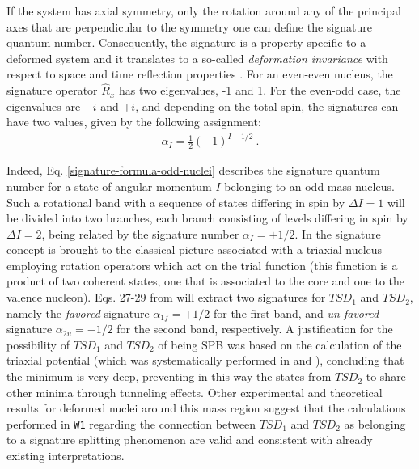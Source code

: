 \documentclass[myclassdoc,debug]{rjparticle}
\begin{document}
If the system has axial symmetry, only the rotation around any of the principal axes that are perpendicular to the symmetry one can define the signature quantum number. Consequently, the signature is a property specific to a deformed system and it translates to a so-called \emph{deformation invariance} with respect to space and time reflection properties \cite{bohr1998nuclear}. For an even-even nucleus, the signature operator $\hat{R}_x$ has two eigenvalues, -1 and 1. For the even-odd case, the eigenvalues are $-i$ and $+i$, and depending on the total spin, the signatures can have two values, given by the following assignment:
\begin{align}
    \alpha_I=\frac{1}{2}\left(-1\right)^{I-1/2}\ .
    \label{signature-formula-odd-nuclei}
\end{align}

Indeed, Eq. \ref{signature-formula-odd-nuclei} describes the signature quantum number for a state of angular momentum $I$ belonging to an odd mass nucleus. Such a rotational band with a sequence of states differing in spin by $\Delta I=1$ will be divided into two branches, each branch consisting of levels differing in spin by $\Delta I=2$, being related by the signature number $\alpha_I=\pm 1/2$. In \cite{raduta2020approach} the signature concept is brought to the classical picture associated with a triaxial nucleus employing rotation operators which act on the trial function (this function is a product of two coherent states, one that is associated to the core and one to the valence nucleon). Eqs. 27-29 from \cite{raduta2020approach} will extract two signatures for $TSD_1$ and $TSD_2$, namely the \emph{favored} signature $\alpha_{1f}=+1/2$ for the first band, and \emph{un-favored} signature $\alpha_{2u}=-1/2$ for the second band, respectively. A justification for the possibility of $TSD_1$ and $TSD_2$ of being SPB was based on the calculation of the triaxial potential (which was systematically performed in \cite{raduta2017semiclassical} and \cite{raduta2018wobbling}), concluding that the minimum is very deep, preventing in this way the states from $TSD_2$ to share other minima through tunneling effects. Other experimental and theoretical results \cite{sun1994varied,khalaf11properties,uma2015deltai,mittal2016signature} for deformed nuclei around this mass region suggest that the calculations performed in \texttt{W1} regarding the connection between $TSD_1$ and $TSD_2$ as belonging to a signature splitting phenomenon are valid and consistent with already existing interpretations.
\end{document}

